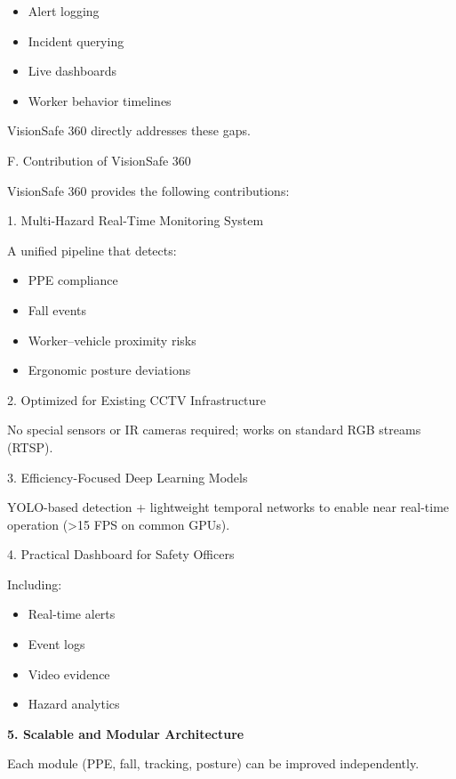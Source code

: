 \begin{itemize}
\item Alert logging
\item Incident querying
\item Live dashboards
\item Worker behavior timelines
\end{itemize}

VisionSafe 360 directly addresses these gaps.

F. Contribution of VisionSafe 360

VisionSafe 360 provides the following contributions:

1. Multi-Hazard Real-Time Monitoring System

A unified pipeline that detects:

\begin{itemize}
\item PPE compliance
\item Fall events
\item Worker–vehicle proximity risks
\item Ergonomic posture deviations
\end{itemize}

2. Optimized for Existing CCTV Infrastructure

No special sensors or IR cameras required; works on standard RGB streams (RTSP).

3. Efficiency-Focused Deep Learning Models

YOLO-based detection + lightweight temporal networks to enable near real-time operation (>15 FPS on common GPUs).

4. Practical Dashboard for Safety Officers

Including:

\begin{itemize}
\item Real-time alerts
\item Event logs
\item Video evidence
\item Hazard analytics
\end{itemize}

\textbf{ 5. Scalable and Modular Architecture}

Each module (PPE, fall, tracking, posture) can be improved independently.


